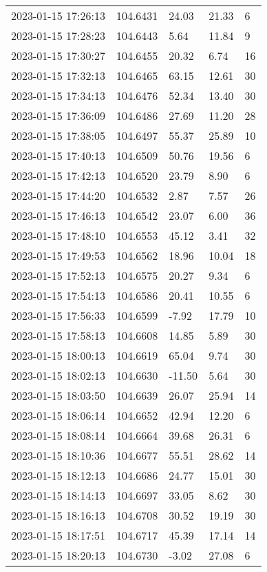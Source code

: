 \documentclass{nature_plusfigure}
\begin{document}
\begin{supplement}
\begin{center}
\begin{longtable}{lllll}
2023-01-15 17:26:13 & 104.6431 & 24.03 & 21.33 & 6 \\ 
2023-01-15 17:28:23 & 104.6443 & 5.64 & 11.84 & 9 \\ 
2023-01-15 17:30:27 & 104.6455 & 20.32 & 6.74 & 16 \\ 
2023-01-15 17:32:13 & 104.6465 & 63.15 & 12.61 & 30 \\ 
2023-01-15 17:34:13 & 104.6476 & 52.34 & 13.40 & 30 \\ 
2023-01-15 17:36:09 & 104.6486 & 27.69 & 11.20 & 28 \\ 
2023-01-15 17:38:05 & 104.6497 & 55.37 & 25.89 & 10 \\ 
2023-01-15 17:40:13 & 104.6509 & 50.76 & 19.56 & 6 \\ 
2023-01-15 17:42:13 & 104.6520 & 23.79 & 8.90 & 6 \\ 
2023-01-15 17:44:20 & 104.6532 & 2.87 & 7.57 & 26 \\ 
2023-01-15 17:46:13 & 104.6542 & 23.07 & 6.00 & 36 \\ 
2023-01-15 17:48:10 & 104.6553 & 45.12 & 3.41 & 32 \\ 
2023-01-15 17:49:53 & 104.6562 & 18.96 & 10.04 & 18 \\ 
2023-01-15 17:52:13 & 104.6575 & 20.27 & 9.34 & 6 \\ 
2023-01-15 17:54:13 & 104.6586 & 20.41 & 10.55 & 6 \\ 
2023-01-15 17:56:33 & 104.6599 & -7.92 & 17.79 & 10 \\ 
2023-01-15 17:58:13 & 104.6608 & 14.85 & 5.89 & 30 \\ 
2023-01-15 18:00:13 & 104.6619 & 65.04 & 9.74 & 30 \\ 
2023-01-15 18:02:13 & 104.6630 & -11.50 & 5.64 & 30 \\ 
2023-01-15 18:03:50 & 104.6639 & 26.07 & 25.94 & 14 \\ 
2023-01-15 18:06:14 & 104.6652 & 42.94 & 12.20 & 6 \\ 
2023-01-15 18:08:14 & 104.6664 & 39.68 & 26.31 & 6 \\ 
2023-01-15 18:10:36 & 104.6677 & 55.51 & 28.62 & 14 \\ 
2023-01-15 18:12:13 & 104.6686 & 24.77 & 15.01 & 30 \\ 
2023-01-15 18:14:13 & 104.6697 & 33.05 & 8.62 & 30 \\ 
2023-01-15 18:16:13 & 104.6708 & 30.52 & 19.19 & 30 \\ 
2023-01-15 18:17:51 & 104.6717 & 45.39 & 17.14 & 14 \\ 
2023-01-15 18:20:13 & 104.6730 & -3.02 & 27.08 & 6 \\ 

\end{longtable}
\end{center}
\end{supplement}
\end{document}
